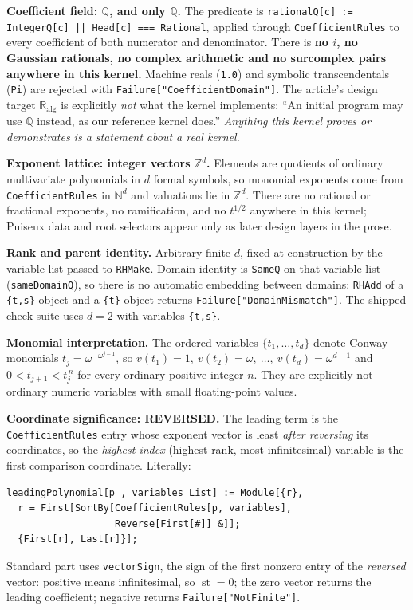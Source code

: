 \documentclass[11pt,letterpaper]{article}
\numberwithin{equation}{section}
\theoremstyle{definition}
\theoremstyle{remark}
\newcommand{\Q}{\mathbb Q}
\newcommand{\N}{\mathbb N}
\newcommand{\Z}{\mathbb Z}
\newcommand{\RA}{\mathbb R_{\mathrm{alg}}}
\newcommand{\st}{\operatorname{st}}
\begin{document}
\textbf{Coefficient field: $\Q$, and only $\Q$.} The predicate is
\texttt{rationalQ[c] := IntegerQ[c] || Head[c] === Rational}, applied through
\texttt{CoefficientRules} to every coefficient of both numerator and
denominator. There is \textbf{no $i$, no Gaussian rationals, no complex
arithmetic and no surcomplex pairs anywhere in this kernel.} Machine reals
(\texttt{1.0}) and symbolic transcendentals (\texttt{Pi}) are rejected with
\texttt{Failure["CoefficientDomain"]}. The article's design target $\RA$ is
explicitly \emph{not} what the kernel implements: ``An initial program may use
$\Q$ instead, as our reference kernel does.'' \emph{Anything this kernel proves
or demonstrates is a statement about a real kernel.}

\textbf{Exponent lattice: integer vectors $\Z^d$.} Elements are quotients of
ordinary multivariate polynomials in $d$ formal symbols, so monomial exponents
come from \texttt{CoefficientRules} in $\N^d$ and valuations lie in $\Z^d$.
There are no rational or fractional exponents, no ramification, and no
$t^{1/2}$ anywhere in this kernel; Puiseux data and root selectors appear only
as later design layers in the prose.

\textbf{Rank and parent identity.} Arbitrary finite $d$, fixed at construction
by the variable list passed to \texttt{RHMake}. Domain identity is
\texttt{SameQ} on that variable list (\texttt{sameDomainQ}), so there is no
automatic embedding between domains: \texttt{RHAdd} of a \texttt{\{t,s\}} object
and a \texttt{\{t\}} object returns \texttt{Failure["DomainMismatch"]}. The
shipped check suite uses $d=2$ with variables \texttt{\{t,s\}}.

\textbf{Monomial interpretation.} The ordered variables $\{t_1,\dots,t_d\}$
denote Conway monomials $t_j=\omega^{-\omega^{j-1}}$, so
$v(t_1)=1,\ v(t_2)=\omega,\ \dots,\ v(t_d)=\omega^{d-1}$ and
$0<t_{j+1}<t_j^{\,n}$ for every ordinary positive integer $n$. They are
explicitly not ordinary numeric variables with small floating-point values.

\textbf{Coordinate significance: REVERSED.} The leading term is the
\texttt{CoefficientRules} entry whose exponent vector is least \emph{after
reversing} its coordinates, so the \emph{highest-index} (highest-rank, most
infinitesimal) variable is the first comparison coordinate. Literally:
\begin{lstlisting}
leadingPolynomial[p_, variables_List] := Module[{r},
  r = First[SortBy[CoefficientRules[p, variables],
                   Reverse[First[#]] &]];
  {First[r], Last[r]}];
\end{lstlisting}
Standard part uses \texttt{vectorSign}, the sign of the first nonzero entry of
the \emph{reversed} vector: positive means infinitesimal, so $\st=0$; the zero
vector returns the leading coefficient; negative returns
\texttt{Failure["NotFinite"]}.
\end{document}
